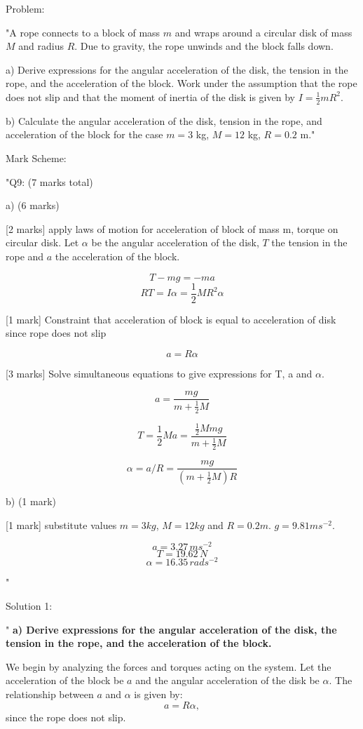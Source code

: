 Problem:

"A rope connects to a block of mass \( m \) and wraps around a circular disk of mass \( M \) and radius \( R \). Due to gravity, the rope unwinds and the block falls down. 

a) Derive expressions for the angular acceleration of the disk, the tension in the rope, and the acceleration of the block. Work under the assumption that the rope does not slip and that the moment of inertia of the disk is given by \( I = \frac{1}{2} m R^{2} \).
    
b) Calculate the angular acceleration of the disk, tension in the rope, and acceleration of the block for the case \( m = 3 \) kg, \( M = 12 \) kg, \( R = 0.2 \) m."

Mark Scheme:

"{Q9: (7 marks total)}

a) (6 marks)

[2 marks] apply laws of motion for acceleration of block of mass m, torque on circular disk. Let \( \alpha \) be the angular acceleration of the disk, \( T \) the tension in the rope and \( a \) the acceleration of the block. 

\[ T - mg = -ma \]
\[ RT = I \alpha = \frac{1}{2} M R^2 \alpha \]

[1 mark] Constraint that acceleration of block is equal to acceleration of disk since rope does not slip 

\[ a = R \alpha \]

[3 marks] Solve simultaneous equations to give expressions for T, a and \( \alpha \).

\[ a = \frac{mg}{m + \frac{1}{2}M} \]

\[ T = \frac{1}{2}Ma = \frac{\frac{1}{2}Mmg}{m + \frac{1}{2}M} \]

\[ \alpha = a / R = \frac{mg}{(m + \frac{1}{2}M)R} \]

b) (1 mark) 

[1 mark] substitute values \(m = 3kg \), \( M = 12kg \) and \( R = 0.2m \). \(g = 9.81 ms^{-2} \).

\[ a = 3.27 \, ms^{-2} \]
\[ T = 19.62 \, N \]
\[ \alpha = 16.35 \, rads^{-2} \]

"

Solution 1: 

"
\textbf{a) Derive expressions for the angular acceleration of the disk, the tension in the rope, and the acceleration of the block.}

We begin by analyzing the forces and torques acting on the system. Let the acceleration of the block be $a$ and the angular acceleration of the disk be $\alpha$. The relationship between $a$ and $\alpha$ is given by:
\[
a = R\alpha,
\]
since the rope does not slip.

